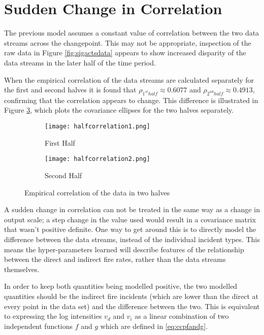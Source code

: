 \documentclass[a4paper,11pt]{report}
\begin{document}
\section{Sudden Change in Correlation}

The previous model assumes a constant value of correlation between the two data streams across the changepoint. This may not be appropriate, inspection of the raw data in Figure \ref{fig:sigactsdata} appears to show increased disparity of the data streams in the later half of the time period. 

When the empirical correlation of the data streams are calculated separately for the first and second halves it is found that \(\rho_{1^{st} half} \approx 0.6077 \) and \(\rho_{2^{nd} half} \approx 0.4913\), confirming that the correlation appears to change. This difference is illustrated in Figure \ref{fig:halfcorrelation}, which plots the covariance ellipses for the two halves separately.  \par
 
\begin{figure}
\centering
\begin{subfigure}{.5\textwidth}
	\centering
	\texttt{[image: halfcorrelation1.png]}
  	\caption{First Half}
  	\label{fig:sub1}
\end{subfigure}%
\begin{subfigure}{.5\textwidth}
  	\centering
  	\texttt{[image: halfcorrelation2.png]}
  	\caption{Second Half}
 	 \label{fig:sub2}
\end{subfigure}
\caption{Empirical correlation of the data in two halves}
\label{fig:halfcorrelation}
\end{figure}

A sudden change in correlation can not be treated in the same way as a change in output scale; a step change in the value used would result in a covariance matrix that wasn't positive definite. One way to get around this is to directly model the difference between the data streams, instead of the individual incident types. This means the hyper-parameters learned will describe features of the relationship between the direct and indirect fire rates, rather than the data streams themselves. \par 

In order to keep both quantities being modelled positive, the two modelled quantities should be the indirect fire incidents (which are lower than the direct at every point in the data set) and the difference between the two. This is equivalent to expressing the log intensities \(v_d\) and \(v_i\) as a linear combination of two independent functions \(f\) and \(g\) which are defined in \ref{eq:ccpfandg}.
\end{document}
